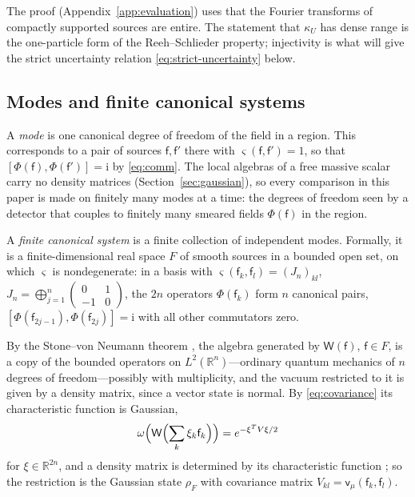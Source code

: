 \documentclass[aps,prl,reprint,longbibliography,raggedbottom]{revtex4-2}
\newcommand{\R}{\mathbb R}
\newcommand{\ii}{\mathrm i}
\newcommand{\cov}{\mathsf v}
\newcommand{\sx}{\mathsf f}
\newcommand{\sy}{\mathsf f'}
\newcommand{\Weyl}{\mathsf W}
\begin{document}
The proof (Appendix~\ref{app:evaluation}) uses that the Fourier
transforms of compactly supported sources are entire. The statement that $\kappa_U$ has dense range is the one-particle form of the Reeh--Schlieder
property; injectivity is what will give the strict uncertainty relation
\eqref{eq:strict-uncertainty} below.

\subsection{Modes and finite canonical systems}
A \emph{mode} is one
canonical degree of freedom of the field in a region. This corresponds to a pair of sources
$\sx,\sy$ there with $\varsigma(\sx,\sy)=1$, so that
$[\Phi(\sx),\Phi(\sy)]=\ii$ by \eqref{eq:comm}. The local algebras of a free massive scalar carry no density matrices
(Section~\ref{sec:gaussian}), so every comparison in this paper is
made on finitely many modes at a time: the degrees of freedom seen by
a detector that couples to finitely many smeared fields $\Phi(\sx)$ in
the region.

A \emph{finite canonical system} is a finite collection of
independent modes. Formally, it is a
finite-dimensional real space $F$
of smooth sources in a bounded open set, on which $\varsigma$ is
nondegenerate: in a basis with
$\varsigma(\sx_k,\sx_l)=(J_n)_{kl}$, $J_n=\bigoplus_{j=1}^n\left(\!\begin{smallmatrix}0&1\\-1&0\end{smallmatrix}\!\right)$,
the $2n$ operators $\Phi(\sx_k)$ form $n$ canonical pairs,
$[\Phi(\sx_{2j-1}),\Phi(\sx_{2j})]=\ii$ with all other commutators
zero. 

By the Stone--von Neumann theorem \cite{Haag96}, the algebra generated by
$\Weyl(\sx)$, $\sx\in F$, is a copy of the bounded operators on
$L^2(\R^n)$---ordinary quantum mechanics of $n$ degrees of
freedom---possibly with multiplicity, and the vacuum restricted to
it is given by a density matrix, since a vector state is normal.
By \eqref{eq:covariance} its characteristic function is Gaussian,
\begin{align}\label{eq:Weyl}
\omega\Bigl(\Weyl\Bigl(\sum_k\xi_k\sx_k\Bigr)\Bigr)=e^{-\xi^TV\xi/2}
\end{align}
for $\xi\in\R^{2n}$, and a density matrix is determined by its
characteristic function \cite{SLW18}; so the restriction is the
Gaussian state $\rho_F$ with
covariance matrix $V_{kl}=\cov_\mu(\sx_k,\sx_l)$.
\end{document}
